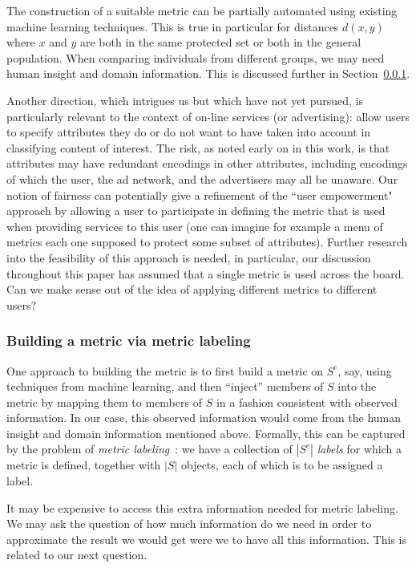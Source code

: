 \documentclass[letterpaper,11pt]{article}
\theoremstyle{definition}
\newcommand{\Scomp}{S^c}
\begin{document}
The construction of a suitable metric can be partially
automated using existing machine learning techniques. This is true in
particular for distances $d(x,y)$ where $x$ and $y$ are both in the same
protected set or both in the general population. When comparing individuals
from different groups, we may need human insight and domain information.
This is discussed further
in Section~\ref{sec:building}.

Another direction, which intrigues us but which have not
yet pursued, is particularly relevant to the context of on-line
services (or advertising):
allow users to specify attributes they do or do not want
to have taken into account in classifying content of interest.
The risk, as noted early on in this work, is
that attributes may
have redundant encodings in other attributes,
including encodings of which the
user, the ad network, and the advertisers may all be unaware.
Our notion of fairness
can potentially give a refinement of the ``user empowerment" approach
by allowing a user to participate in defining the metric that is used
when providing services to this user (one can imagine for example a
menu of metrics each one supposed to protect some subset of
attributes). Further research into the feasibility of this approach is
needed, in particular, our discussion throughout
this paper has assumed that a single metric
is used across the board.  Can we make sense out of the idea of applying
different metrics to different users?

\subsubsection{Building a metric via metric labeling}
\label{sec:building}

%
One approach to building the metric is to first build a metric on $\Scomp$,
say, using techniques from machine learning, and then ``inject''
members of $S$ into the metric by mapping them to members of $S$ in a
fashion consistent with observed information.
In our case, this observed information would come from the human
insight and domain information mentioned above.
Formally, this can be captured by the problem
of {\em metric labeling}~\cite{KleinbergTa02}:
we have a collection of $|\Scomp|$ {\em labels} for which a metric is
defined, together with $|S|$ objects, each of which is to be assigned a label.

It may be expensive to access this extra information
needed for metric labeling. We may ask the question of how much information
do we need in order to approximate the result we would get were we to
have all this information.  This is related to
our next question.
\end{document}

